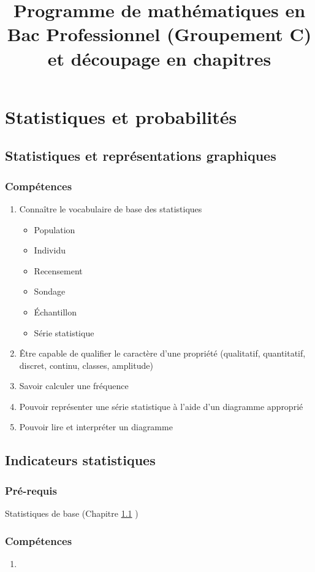 \documentclass[12pt,a4paper]{article}
\author{}
\date{}
\title{Programme de mathématiques en Bac Professionnel (Groupement C) et découpage en chapitres}
\begin{document}
\maketitle

\section{Statistiques et probabilités}

\subsection{Statistiques et représentations graphiques }\label{ch:2:stats_base}

\subsubsection*{Compétences}

\begin{enumerate}
	\item Connaître le vocabulaire de base des statistiques 
	\begin{itemize}
		\item Population
		\item Individu
		\item Recensement
		\item Sondage
		\item \'Echantillon
		\item Série statistique

	\end{itemize}
	\item Être capable de qualifier le caractère d'une propriété (qualitatif, quantitatif, discret, continu, classes, amplitude)
	\item Savoir calculer une fréquence
	\item Pouvoir représenter une série statistique à l'aide d'un diagramme approprié
	\item Pouvoir lire et interpréter un diagramme
	
\end{enumerate}


\subsection{Indicateurs statistiques}\label{ch:2:indicateurs}

\subsubsection*{Pré-requis}
	Statistiques de base (Chapitre \ref{ch:2:stats_base} )
	
\subsubsection*{Compétences}
	\begin{enumerate}
		\item 
	\end{enumerate}
\end{document}
